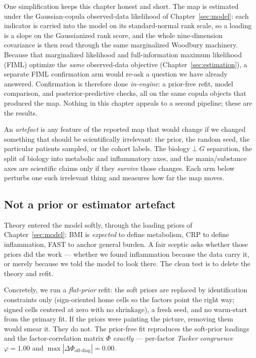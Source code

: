 One simplification keeps this chapter honest and short. The map is estimated under the Gaussian-copula
observed-data likelihood of Chapter~\ref{sec:model}: each indicator is carried into the model on its
standard-normal rank scale, so a loading is a slope on the Gaussianized rank score, and the whole
nine-dimension covariance is then read through the same marginalized Woodbury machinery. Because that
marginalized likelihood and full-information maximum likelihood (FIML) optimize the \emph{same} observed-data
objective (Chapter~\ref{sec:estimation}), a separate FIML confirmation arm would re-ask a question we have
already answered. Confirmation is therefore done \emph{in-engine}: a prior-free refit, model comparison, and
posterior-predictive checks, all on the same copula objects that produced the map. Nothing in this chapter
appeals to a second pipeline; these are the results.

\begin{definitionbox}
An \emph{artefact} is any feature of the reported map that would change if we changed something that should be
scientifically irrelevant: the prior, the random seed, the particular patients sampled, or the cohort
labels. The biology$\perp$$G$ separation, the split of biology into metabolic and inflammatory axes, and the
mania/substance axes are scientific claims only if they \emph{survive} those changes. Each arm below perturbs
one such irrelevant thing and measures how far the map moves.
\end{definitionbox}

\subsection{Not a prior or estimator artefact}
\label{sub:confirm}
Theory entered the model softly, through the loading priors of Chapter~\ref{sec:model}: BMI is
\emph{expected} to define metabolism, CRP to define inflammation, FAST to anchor general burden. A fair
sceptic asks whether those priors did the work --- whether we found inflammation because the data carry it, or
merely because we told the model to look there. The clean test is to delete the theory and refit.

Concretely, we run a \emph{flat-prior} refit: the soft priors are replaced by identification constraints only
(sign-oriented home cells so the factors point the right way; signed cells centered at zero with no shrinkage),
a fresh seed, and no warm-start from the primary fit. If the priors were painting the picture, removing them
would smear it. They do not. The prior-free fit reproduces the soft-prior loadings and the factor-correlation
matrix $\Phi$ \emph{exactly} --- per-factor \emph{Tucker congruence} $\varphi = 1.00$ and
$\max|\Delta\Phi_{\text{off-diag}}| = 0.00$.

